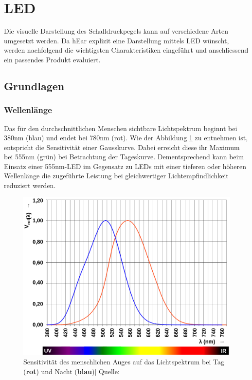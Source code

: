 \documentclass[12pt]{article}
\begin{document}
	\newpage
	\section{LED}\label{LED}
	Die visuelle Darstellung des Schalldruckpegels kann auf verschiedene Arten umgesetzt werden. Da hEar explizit eine Darstellung mittels LED wünscht, werden nachfolgend die wichtigsten Charakteristiken eingeführt und anschlie\-ssend ein passendes Produkt evaluiert.
	\subsection{Grundlagen}
	\subsubsection*{Wellenlänge} \label{Wellenlänge}
	Das für den durchschnittlichen Menschen sichtbare Lichtspektrum beginnt bei 380nm (blau) und endet bei 780nm (rot)\cite{noauthor_v-lambda-kurve_2023}. Wie der Abbildung \ref{fig:batv-lambda-curve} zu entnehmen ist, entspricht die Sensitivität einer Gausskurve. Dabei erreicht diese ihr Maximum bei 555nm (grün) bei Betrachtung der Tageskurve. Dementsprechend kann beim Einsatz einer 555nm-LED im Gegensatz zu LEDs mit einer tieferen oder höheren Wellenlänge die zugeführte Leistung bei gleichwertiger Lichtempfindlichkeit reduziert werden.
	\begin{figure}[H]
		\centering
		\includegraphics[width=0.8\linewidth]{images/BAT_v-lambda-curve}
		\caption{Sensitivität des menschlichen Auges auf das Lichtspektrum bei Tag (\color{red}\textbf{rot}\color{black}) und Nacht (\color{blue}\textbf{blau}\color{black})$\vert$ Quelle: \cite{noauthor_v-lambda-kurve_2023}}
		\label{fig:batv-lambda-curve}
	\end{figure}
\end{document}
